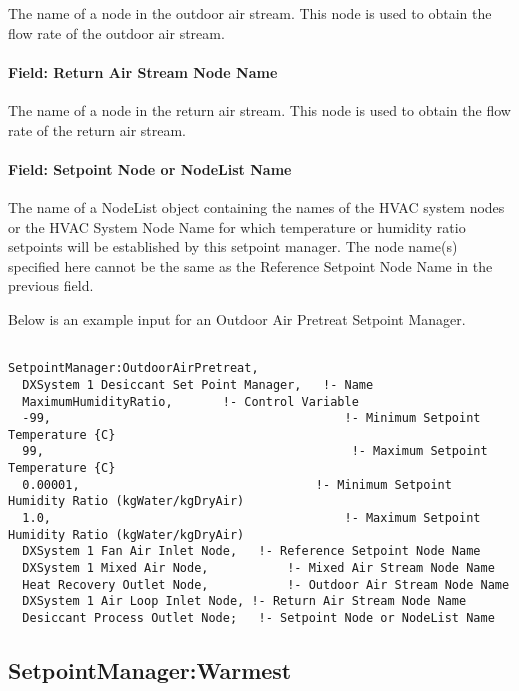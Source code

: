 The name of a node in the outdoor air stream. This node is used to obtain the flow rate of the outdoor air stream.

\paragraph{Field: Return Air Stream Node Name}\label{field-return-air-stream-node-name-000}

The name of a node in the return air stream. This node is used to obtain the flow rate of the return air stream.

\paragraph{Field: Setpoint Node or NodeList Name}\label{field-setpoint-node-or-nodelist-name-9}

The name of a NodeList object containing the names of the HVAC system nodes or the HVAC System Node Name for which temperature or humidity ratio setpoints will be established by this setpoint manager. The node name(s) specified here cannot be the same as the Reference Setpoint Node Name in the previous field.


Below is an example input for an Outdoor Air Pretreat Setpoint Manager.

\begin{lstlisting}

SetpointManager:OutdoorAirPretreat,
  DXSystem 1 Desiccant Set Point Manager,   !- Name
  MaximumHumidityRatio,       !- Control Variable
  -99,                                         !- Minimum Setpoint Temperature {C}
  99,                                           !- Maximum Setpoint Temperature {C}
  0.00001,                                 !- Minimum Setpoint Humidity Ratio (kgWater/kgDryAir)
  1.0,                                         !- Maximum Setpoint Humidity Ratio (kgWater/kgDryAir)
  DXSystem 1 Fan Air Inlet Node,   !- Reference Setpoint Node Name
  DXSystem 1 Mixed Air Node,           !- Mixed Air Stream Node Name
  Heat Recovery Outlet Node,           !- Outdoor Air Stream Node Name
  DXSystem 1 Air Loop Inlet Node, !- Return Air Stream Node Name
  Desiccant Process Outlet Node;   !- Setpoint Node or NodeList Name
\end{lstlisting}

\subsection{SetpointManager:Warmest}\label{setpointmanagerwarmest}

